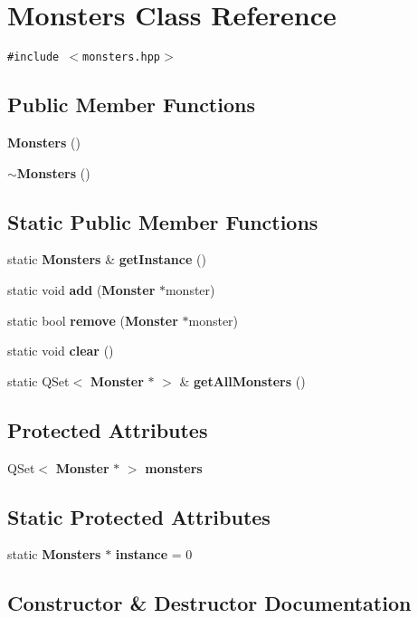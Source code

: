 \section{Monsters Class Reference}
\label{classMonsters}
{\tt \#include $<$monsters.hpp$>$}

\subsection*{Public Member Functions}
\begin{CompactItemize}
\item 
{\bf Monsters} ()
\item 
{\bf $\sim$Monsters} ()
\end{CompactItemize}
\subsection*{Static Public Member Functions}
\begin{CompactItemize}
\item 
static {\bf Monsters} \& {\bf get\-Instance} ()
\item 
static void {\bf add} ({\bf Monster} $\ast$monster)
\item 
static bool {\bf remove} ({\bf Monster} $\ast$monster)
\item 
static void {\bf clear} ()
\item 
static QSet$<$ {\bf Monster} $\ast$ $>$ \& {\bf get\-All\-Monsters} ()
\end{CompactItemize}
\subsection*{Protected Attributes}
\begin{CompactItemize}
\item 
QSet$<$ {\bf Monster} $\ast$ $>$ {\bf monsters}
\end{CompactItemize}
\subsection*{Static Protected Attributes}
\begin{CompactItemize}
\item 
static {\bf Monsters} $\ast$ {\bf instance} = 0
\end{CompactItemize}


\subsection{Constructor \& Destructor Documentation}
